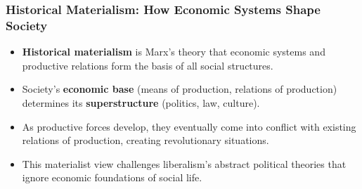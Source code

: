 \documentclass{beamer}
\begin{document}
\begin{frame}
\frametitle{Historical Materialism: How Economic Systems Shape Society}
\begin{itemize}
    \item \textbf{Historical materialism} is Marx's theory that economic systems and productive relations form the basis of all social structures.
    \item Society's \textbf{economic base} (means of production, relations of production) determines its \textbf{superstructure} (politics, law, culture).
    \item As productive forces develop, they eventually come into conflict with existing relations of production, creating revolutionary situations.
    \item This materialist view challenges liberalism's abstract political theories that ignore economic foundations of social life.
\end{itemize}

\begin{center}
\end{center}
\end{frame}
\end{document}
